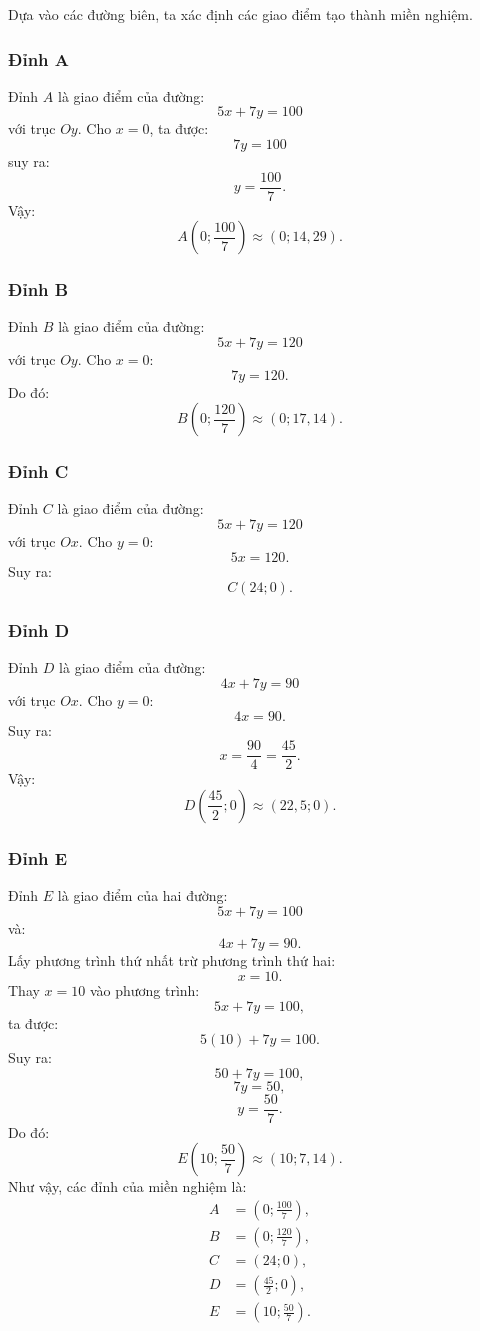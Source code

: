 \documentclass[12pt,a4paper]{article}
\begin{document}
Dựa vào các đường biên, ta xác định các giao điểm tạo thành miền nghiệm.
\subsubsection*{Đỉnh A}
Đỉnh $A$ là giao điểm của đường:
\[
5x+7y=100
\]
với trục $Oy$.
Cho $x=0$, ta được:
\[
7y=100
\]
suy ra:
\[
y=\frac{100}{7}.
\]
Vậy:
\[
\boxed{
A\left(0;\frac{100}{7}\right)
}
\approx(0;14,29).
\]
\subsubsection*{Đỉnh B}
Đỉnh $B$ là giao điểm của đường:
\[
5x+7y=120
\]
với trục $Oy$.
Cho $x=0$:
\[
7y=120.
\]
Do đó:
\[
\boxed{
B\left(0;\frac{120}{7}\right)
}
\approx(0;17,14).
\]
\subsubsection*{Đỉnh C}
Đỉnh $C$ là giao điểm của đường:
\[
5x+7y=120
\]
với trục $Ox$.
Cho $y=0$:
\[
5x=120.
\]
Suy ra:
\[
\boxed{C(24;0)}.
\]
\subsubsection*{Đỉnh D}
Đỉnh $D$ là giao điểm của đường:
\[
4x+7y=90
\]
với trục $Ox$.
Cho $y=0$:
\[
4x=90.
\]
Suy ra:
\[
x=\frac{90}{4}=\frac{45}{2}.
\]
Vậy:
\[
\boxed{
D\left(\frac{45}{2};0\right)
}
\approx(22,5;0).
\]
\subsubsection*{Đỉnh E}
Đỉnh $E$ là giao điểm của hai đường:
\[
5x+7y=100
\]
và:
\[
4x+7y=90.
\]
Lấy phương trình thứ nhất trừ phương trình thứ hai:
\[
x=10.
\]
Thay $x=10$ vào phương trình:
\[
5x+7y=100,
\]
ta được:
\[
5(10)+7y=100.
\]
Suy ra:
\[
50+7y=100,
\]
\[
7y=50,
\]
\[
y=\frac{50}{7}.
\]
Do đó:
\[
\boxed{
E\left(10;\frac{50}{7}\right)
}
\approx(10;7,14).
\]
Như vậy, các đỉnh của miền nghiệm là:
\[
\boxed{
\begin{aligned}
A&=\left(0;\frac{100}{7}\right),\\
B&=\left(0;\frac{120}{7}\right),\\
C&=(24;0),\\
D&=\left(\frac{45}{2};0\right),\\
E&=\left(10;\frac{50}{7}\right).
\end{aligned}}
\]

\end{document}
